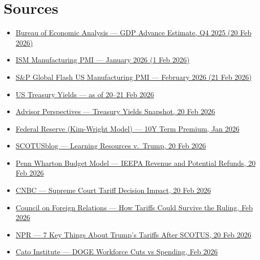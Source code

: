\documentclass{wilson-report}
\begin{document}
\section*{Sources}
\small
\begin{itemize}[leftmargin=1.2em, itemsep=2pt]
  \item \href{https://tradingeconomics.com/united-states/gdp-growth}{Bureau of Economic Analysis --- GDP Advance Estimate, Q4 2025 (20 Feb 2026)}
  \item \href{https://www.advisorperspectives.com/dshort/updates/2026/02/02/ism-manufacturing-pmi-strongest-expansion-january-2026}{ISM Manufacturing PMI --- January 2026 (1 Feb 2026)}
  \item \href{https://tradingeconomics.com/united-states/manufacturing-pmi}{S\&P Global Flash US Manufacturing PMI --- February 2026 (21 Feb 2026)}
  \item \href{https://tradingeconomics.com/united-states/government-bond-yield}{US Treasury Yields --- as of 20--21 Feb 2026}
  \item \href{https://www.advisorperspectives.com/dshort/updates/2026/02/20/treasury-yields-snapshot-february-20-2026}{Advisor Perspectives --- Treasury Yields Snapshot, 20 Feb 2026}
  \item \href{https://fred.stlouisfed.org/series/THREEFYTP10}{Federal Reserve (Kim-Wright Model) --- 10Y Term Premium, Jan 2026}
  \item \href{https://www.scotusblog.com/2026/02/supreme-court-strikes-down-tariffs/}{SCOTUSblog --- Learning Resources v.\ Trump, 20 Feb 2026}
  \item \href{https://budgetmodel.wharton.upenn.edu/issues/2026/2/20/supreme-court-tariff-ruling-ieepa-revenue-and-potential-refunds}{Penn Wharton Budget Model --- IEEPA Revenue and Potential Refunds, 20 Feb 2026}
  \item \href{https://www.cnbc.com/2026/02/20/supreme-court-trump-tariff-decision-illegal-refunds.html}{CNBC --- Supreme Court Tariff Decision Impact, 20 Feb 2026}
  \item \href{https://www.cfr.org/articles/how-trumps-tariffs-could-survive-the-supreme-court-ruling}{Council on Foreign Relations --- How Tariffs Could Survive the Ruling, Feb 2026}
  \item \href{https://www.npr.org/2026/02/20/nx-s1-5677609/tariffs-economy-trump-supreme-court}{NPR --- 7 Key Things About Trump's Tariffs After SCOTUS, 20 Feb 2026}
  \item \href{https://www.cato.org/blog/doge-produced-largest-peacetime-workforce-cut-record-spending-kept-rising-0}{Cato Institute --- DOGE Workforce Cuts vs Spending, Feb 2026}

\end{itemize}
\end{document}
